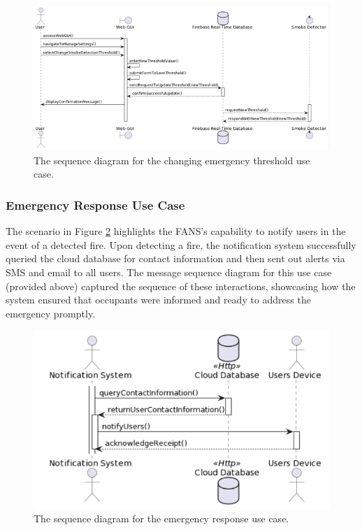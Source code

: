 \begin{figure}
    \centering
    \includegraphics[width=\imagewidth]{../assets/sequence/ChangingSmokeDetectionThresholdSequenceDiagram.png}
    \caption{The sequence diagram for the changing emergency threshold use case.}
    \label{fig:change-thresh}
\end{figure}

\subsubsection{Emergency Response Use Case}

The scenario in Figure \ref{fig:emergency-resp} highlights the FANS’s capability to notify users in the event of a
detected fire. Upon detecting a fire, the notification system successfully queried the cloud database for contact
information and then sent out alerts via SMS and email to all users. The message sequence diagram for this use case
(provided above) captured the sequence of these interactions, showcasing how the system ensured that occupants were
informed and ready to address the emergency promptly.

\begin{figure}
    \centering
    \includegraphics[width=\imagewidth]{../assets/sequence/EmergencyResponseUseCase.png}
    \caption{The sequence diagram for the emergency response use case.}
    \label{fig:emergency-resp}
\end{figure}
